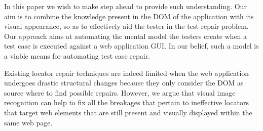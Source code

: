 In this paper we wish to make step ahead to provide such understanding. 
Our aim is to combine the knowledge present in the DOM of the application with its visual appearance, so as to effectively aid the tester in the test repair problem. Our approach aims at automating the mental model the testers create when a test case is executed against a web application GUI. In our belief, such a model is a viable means for automating test case repair.

Existing locator repair techniques are indeed limited when the web application undergoes drastic structural changes because they only consider the DOM as source where to find possible repairs.
However, we argue that visual image recognition can help to fix all the breakages that pertain to ineffective locators that target web elements that are still present and visually displayed within the same web page.



